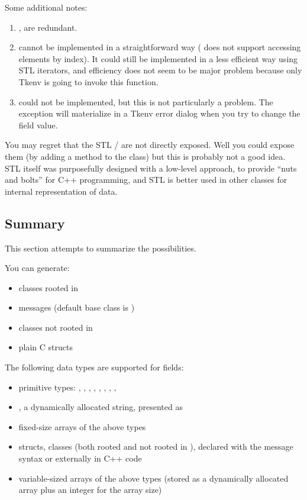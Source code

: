 Some additional notes:

\begin{enumerate}
  \item{,  are redundant.}
  \item{ cannot be implemented in a straightforward way
     ( does not support accessing elements by index).
     It could still be implemented in a less efficient way using STL iterators,
     and efficiency does not seem to be major problem because only Tkenv
     is going to invoke this function.}
  \item{ could not be implemented, but this
     is not particularly a problem. The exception will materialize in a
     Tkenv error dialog when you try to change the field value.}
\end{enumerate}

You may regret that the STL / are not directly exposed.
Well you could expose them (by adding a 
method to the class) but this is probably not a good idea.
STL itself was purposefully designed with a low-level approach, to provide
``nuts and bolts'' for C++ programming, and STL is better used in other classes
for internal representation of data.



\subsection{Summary}

This section attempts to summarize the possibilities.

You can generate:

\begin{itemize}
  \item  classes rooted in 
  \item  messages (default base class is )
  \item  classes not rooted in 
  \item  plain C structs
\end{itemize}

The following data types are supported for fields:

\begin{itemize}
  \item  primitive types: , , ,
    , , , ,
    , 
  \item  {}, a dynamically allocated string, presented as 
  \item  fixed-size arrays of the above types
  \item  structs, classes (both rooted and not rooted in ),
    declared with the message syntax or externally in C++ code
  \item  variable-sized arrays of the above types (stored as a dynamically
    allocated array plus an integer for the array size)
\end{itemize}

